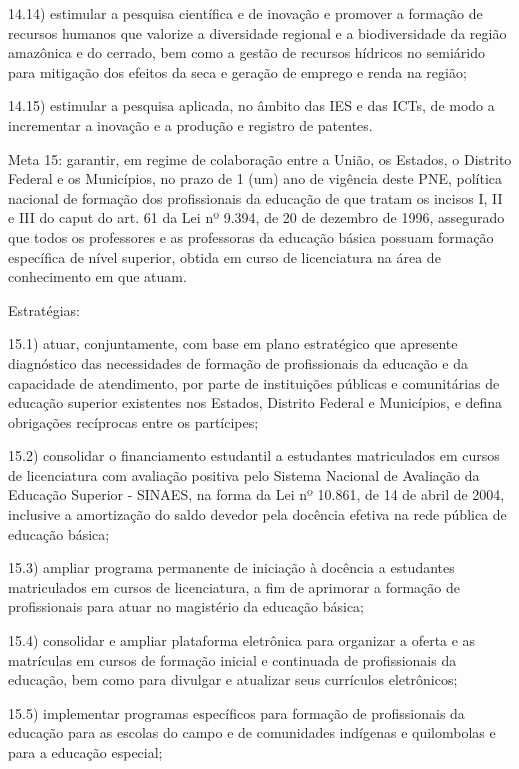 \documentclass[
]{book}
\begin{document}
14.14) estimular a pesquisa científica e de inovação e promover a formação de recursos humanos que valorize a diversidade regional e a biodiversidade da região amazônica e do cerrado, bem como a gestão de recursos hídricos no semiárido para mitigação dos efeitos da seca e geração de emprego e renda na região;

14.15) estimular a pesquisa aplicada, no âmbito das IES e das ICTs, de modo a incrementar a inovação e a produção e registro de patentes.

Meta 15: garantir, em regime de colaboração entre a União, os Estados, o Distrito Federal e os Municípios, no prazo de 1 (um) ano de vigência deste PNE, política nacional de formação dos profissionais da educação de que tratam os incisos I, II e III do caput do art. 61 da Lei nº 9.394, de 20 de dezembro de 1996, assegurado que todos os professores e as professoras da educação básica possuam formação específica de nível superior, obtida em curso de licenciatura na área de conhecimento em que atuam.

Estratégias:

15.1) atuar, conjuntamente, com base em plano estratégico que apresente diagnóstico das necessidades de formação de profissionais da educação e da capacidade de atendimento, por parte de instituições públicas e comunitárias de educação superior existentes nos Estados, Distrito Federal e Municípios, e defina obrigações recíprocas entre os partícipes;

15.2) consolidar o financiamento estudantil a estudantes matriculados em cursos de licenciatura com avaliação positiva pelo Sistema Nacional de Avaliação da Educação Superior - SINAES, na forma da Lei nº 10.861, de 14 de abril de 2004, inclusive a amortização do saldo devedor pela docência efetiva na rede pública de educação básica;

15.3) ampliar programa permanente de iniciação à docência a estudantes matriculados em cursos de licenciatura, a fim de aprimorar a formação de profissionais para atuar no magistério da educação básica;

15.4) consolidar e ampliar plataforma eletrônica para organizar a oferta e as matrículas em cursos de formação inicial e continuada de profissionais da educação, bem como para divulgar e atualizar seus currículos eletrônicos;

15.5) implementar programas específicos para formação de profissionais da educação para as escolas do campo e de comunidades indígenas e quilombolas e para a educação especial;
\end{document}
